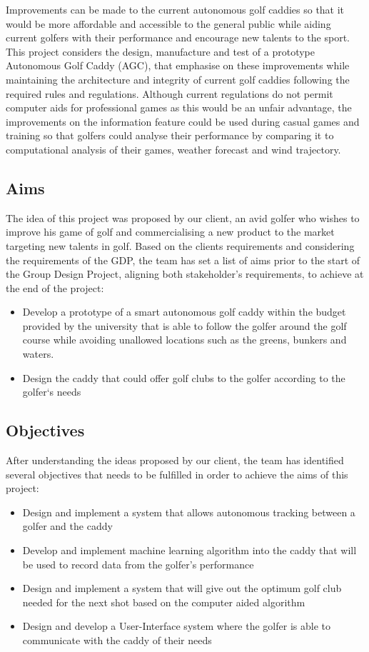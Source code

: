 \documentclass[11pt,landscape]{article}
\begin{document}
\begin{multicols}{3}
Improvements can be made to the current autonomous golf caddies so that it would
be more affordable and accessible to the general public while aiding current
golfers with their performance and encourage new talents to the sport. This
project considers the design, manufacture and test of a prototype
Autonomous Golf Caddy (AGC), that emphasise on these improvements while
maintaining the architecture and integrity of current golf caddies following the
required rules and regulations. Although current regulations do not permit
computer aids for professional games as this would be an unfair advantage, the
improvements on the information feature could be used during casual games and
training so that golfers could analyse their performance by comparing it to
computational analysis of their games, weather forecast and wind trajectory.  

\subsection{Aims}
The idea of this project was proposed by our client, an avid golfer who wishes
to improve his game of golf and commercialising a new product to the market
targeting new talents in golf. Based on the clients requirements and considering
the requirements of the GDP, the team has set a list of aims prior to the start
of the Group Design Project, aligning both stakeholder's requirements, to
achieve at the end of the project: 
\begin{itemize}
    \item Develop a prototype of a smart autonomous golf caddy within the budget
    provided by the university that is able to follow the golfer around the golf
    course while avoiding unallowed locations such as the greens, bunkers and
    waters. 
    \item Design the caddy that could offer golf clubs to the golfer according
    to the golfer`s needs 
\end{itemize}

\subsection{Objectives}
After understanding the ideas proposed by our client, the team has identified
several objectives that needs to be fulfilled in order to achieve the aims of
this project: 
\begin{itemize}
    \item Design and implement a system that allows autonomous tracking between
    a golfer and the caddy 
    \item Develop and implement machine learning algorithm into the caddy that
    will be used to record data from the golfer’s performance 
    \item Design and implement a system that will give out the optimum golf club
    needed for the next shot based on the computer aided algorithm 
    \item Design and develop a User-Interface system where the golfer is able to
    communicate with the caddy of their needs 
\end{itemize}


\end{multicols}
\end{document}
